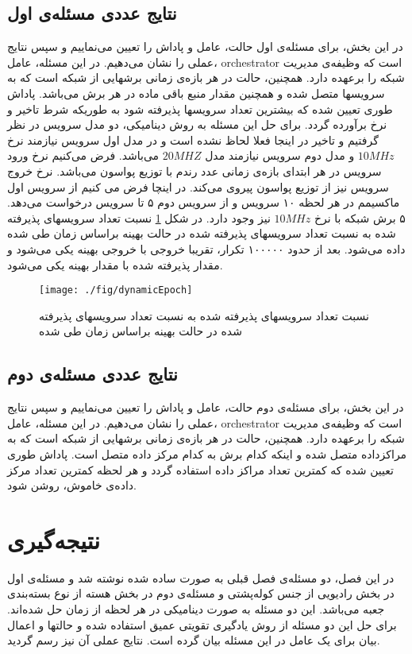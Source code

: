 \subsection{نتایج عددی مسئله‌ی اول}
در این بخش، برای مسئله‌ی اول حالت، عامل و پاداش را تعیین می‌نماییم و سپس نتایج عملی را نشان می‌دهیم.
در این مسئله، عامل، orchestrator است که وظیفه‌ی مدیریت شبکه را برعهده دارد.
همچنین، حالت در هر بازه‌ی زمانی برشهایی از شبکه است که به سرویسها متصل شده و همچنین مقدار منبع باقی ماده در هر برش می‌باشد. 
پاداش طوری تعیین شده که بیشترین تعداد سرویسها پذیرفته شود به طوریکه شرط تاخیر و نرخ برآورده گردد.
برای حل این مسئله به روش دینامیکی، دو مدل سرویس در نظر گرفتیم و تاخیر در اینجا فعلا لحاظ نشده است و در مدل اول سرویس نیازمند نرخ $10MHz$ و مدل دوم سرویس نیازمند مدل $20MHZ$
می‌باشد. فرض می‌کنیم نرخ ورود سرویس در هر ابتدای بازه‌ی زمانی عدد رندم با توزیع پواسون می‌باشد. نرخ خروج سرویس نیز از توزیع پواسون پیروی می‌کند. در اینچا فرض می کنیم از  سرویس اول ماکسیمم در هر لحظه ۱۰ سرویس و از سرویس دوم ۵ تا سرویس درخواست می‌دهد. ۵ برش شبکه با نرخ $10MHz$ نیز وجود دارد. 
در شکل \ref{fig:dynamicEpoch}
نسبت تعداد سرویسهای پذیرفته شده به نسبت تعداد سرویسهای پذیرفته شده در حالت بهینه براساس زمان طی شده داده می‌شود. بعد از حدود ۱۰۰۰۰۰ تکرار، تقریبا خروجی با خروجی بهینه یکی می‌شود و مقدار پذیرفته شده با مقدار بهینه یکی می‌شود.

\begin{figure}%
	\centering
	\texttt{[image: ./fig/dynamicEpoch]} %
	\caption{ نسبت تعداد سرویسهای پذیرفته شده به نسبت تعداد سرویسهای پذیرفته شده در حالت بهینه براساس زمان طی شده}
	\label{fig:dynamicEpoch}
\end{figure}
\subsection{نتایج عددی مسئله‌ی دوم} 
در این بخش، برای مسئله‌ی دوم حالت، عامل و پاداش را تعیین می‌نماییم و سپس نتایج عملی را نشان می‌دهیم.
در این مسئله، عامل، orchestrator است که وظیفه‌ی مدیریت شبکه را برعهده دارد.
همچنین، حالت در هر بازه‌ی زمانی برشهایی از شبکه است که به مراکزداده متصل شده و اینکه کدام برش به کدام مرکز داده متصل است.
پاداش طوری تعیین شده که کمترین تعداد مراکز داده استفاده گردد و هر لحظه کمترین تعداد مرکز داده‌ی خاموش، روشن شود.
\section{نتیجه‌گیری}
در این فصل، دو مسئله‌ی فصل قبلی به صورت ساده شده نوشته شد و مسئله‌ی اول در بخش رادیویی از جنس کوله‌پشتی و مسئله‌ی دوم در بخش هسته از نوع 
بسته‌بندی جعبه می‌باشد. این دو مسئله به صورت دینامیکی در هر لحظه از زمان حل شده‌اند. برای حل این دو مسئله از روش یادگیری تقویتی عمیق استفاده شده و حالتها و اعمال بیان برای یک عامل در این مسئله بیان گرده است.
نتایج عملی آن نیز رسم گردید.

  